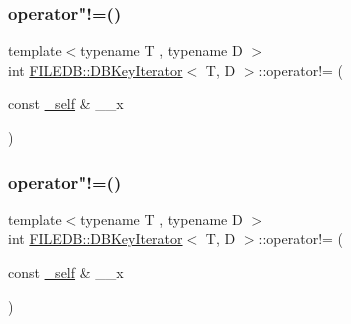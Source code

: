 \subsubsection{\texorpdfstring{operator"!=()}{operator!=()}\hspace{0.1cm}{\footnotesize\ttfamily [2/3]}}
{\footnotesize\ttfamily template$<$typename T , typename D $>$ \\
int \mbox{\hyperlink{classFILEDB_1_1DBKeyIterator}{F\+I\+L\+E\+D\+B\+::\+D\+B\+Key\+Iterator}}$<$ T, D $>$\+::operator!= (\begin{DoxyParamCaption}\item[{const \mbox{\hyperlink{classFILEDB_1_1DBKeyIterator_aaf7773c7a848ec6e04bc738dd794ace1}{\+\_\+self}} \&}]{\+\_\+\+\_\+x }\end{DoxyParamCaption})\hspace{0.3cm}{\ttfamily [inline]}}

\mbox{\label{classFILEDB_1_1DBKeyIterator_aa92d51bde395e8c546d9cbe1c65ef5e1}} 
\subsubsection{\texorpdfstring{operator"!=()}{operator!=()}\hspace{0.1cm}{\footnotesize\ttfamily [3/3]}}
{\footnotesize\ttfamily template$<$typename T , typename D $>$ \\
int \mbox{\hyperlink{classFILEDB_1_1DBKeyIterator}{F\+I\+L\+E\+D\+B\+::\+D\+B\+Key\+Iterator}}$<$ T, D $>$\+::operator!= (\begin{DoxyParamCaption}\item[{const \mbox{\hyperlink{classFILEDB_1_1DBKeyIterator_aaf7773c7a848ec6e04bc738dd794ace1}{\+\_\+self}} \&}]{\+\_\+\+\_\+x }\end{DoxyParamCaption})\hspace{0.3cm}{\ttfamily [inline]}}

\mbox{\label{classFILEDB_1_1DBKeyIterator_ab3cfba3f2b19b6eb74ff614c62195ab4}} 
